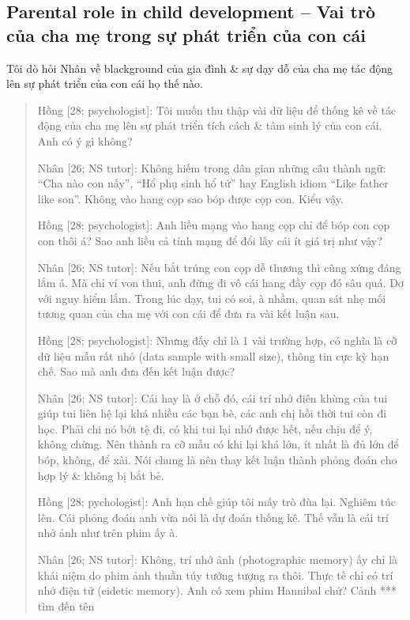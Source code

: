 \documentclass[12pt]{article}
\begin{document}
\subsection{Parental role in child development -- Vai trò của cha mẹ trong sự phát triển của con cái}
Tôi dò hỏi Nhân về blackground của gia đình \& sự dạy dỗ của cha mẹ tác động lên sự phát triển của con cái họ thế nào.
\begin{quotation}
	{\sf Hồng [28; psychologist]}: Tôi muốn thu thập vài dữ liệu để thống kê về tác động của cha mẹ lên sự phát triển tích cách \& tâm sinh lý của con cái. Anh có ý gì không?

	{\sf Nhân [26; NS tutor]}: Không hiếm trong dân gian những câu thành ngữ: ``Cha nào con nấy'', ``Hổ phụ sinh hổ tử'' hay English idiom ``Like father like son''. Không vào hang cọp sao bóp được cọp con. Kiểu vậy.
	
	{\sf Hồng [28; psychologist]}: Anh liều mạng vào hang cọp chỉ để bóp con cọp con thôi á? Sao anh liều cả tính mạng để đổi lấy cái ít giá trị như vậy?
	
	{\sf Nhân [26; NS tutor]}: Nếu bắt trúng con cọp dễ thương thì cũng xứng đáng lắm á. Mà chỉ ví von thui, anh đừng đi vô cái hang đầy cọp đó sâu quá. Dơ với nguy hiểm lắm. Trong lúc dạy, tui có soi, à nhầm, quan sát nhẹ mối tương quan của cha mẹ với con cái để đưa ra vài kết luận sau.
	
	{\sf Hồng [28; psychologist]}: Nhưng đấy chỉ là 1 vài trường hợp, có nghĩa là cỡ dữ liệu mẫu rất nhỏ (data sample with small size), thông tin cực kỳ hạn chế. Sao mà anh đưa đến kết luận được?
	
	{\sf Nhân [26; NS tutor]}: Cái hay là ở chỗ đó, cái trí nhớ điên khùng của tui giúp tui liên hệ lại khá nhiều các bạn bè, các anh chị hồi thời tui còn đi học. Phải chi nó bớt tệ đi, có khi tui lại nhớ được hết, nếu chịu để ý, không chừng. Nên thành ra cỡ mẫu có khi lại khá lớn, ít nhất là đủ lớn để bóp, không, để xài. Nói chung là nên thay kết luận thành phỏng đoán cho hợp lý \& không bị bắt bẻ.
	
	{\sf Hồng [28; pychologist]}: Anh hạn chế giúp tôi mấy trò đùa lại. Nghiêm túc lên. Cái phỏng đoán anh vừa nói là dự đoán thống kê. Thế vẫn là cái trí nhớ ảnh như trên phim ấy à.
	
	{\sf Nhân [26; NS tutor]}: Không, trí nhớ ảnh (photographic memory) ấy chỉ là khái niệm do phim ảnh thuần túy tưởng tượng ra thôi. Thực tế chỉ có trí nhớ điện tử (eidetic memory). Anh có xem phim Hannibal chứ? Cảnh *** tìm đến tên
	

\end{quotation}
\end{document}
